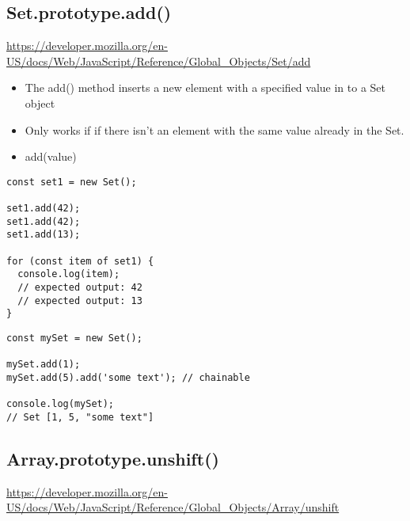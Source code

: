 \documentclass[10pt]{article}
\begin{document}
\medskip %









\medskip %
\pagebreak
\subsection{Set.prototype.add()}

\url{https://developer.mozilla.org/en-US/docs/Web/JavaScript/Reference/Global_Objects/Set/add}

\begin{itemize}
	\item The add() method inserts a new element with a specified value in to a Set object
	\item  Only works if  if there isn't an element with the same value already in the Set.
	\item add(value)

\end{itemize}

\begin{lstlisting}[title=Example add(), captionpos=t]
const set1 = new Set();

set1.add(42);
set1.add(42);
set1.add(13);

for (const item of set1) {
  console.log(item);
  // expected output: 42
  // expected output: 13
}
\end{lstlisting}

\begin{lstlisting}[title=Example add(), captionpos=t]
const mySet = new Set();

mySet.add(1);
mySet.add(5).add('some text'); // chainable

console.log(mySet);
// Set [1, 5, "some text"]
\end{lstlisting}

\medskip %








\medskip %
\pagebreak
\subsection{Array.prototype.unshift()}

\url{https://developer.mozilla.org/en-US/docs/Web/JavaScript/Reference/Global_Objects/Array/unshift}
\end{document}
